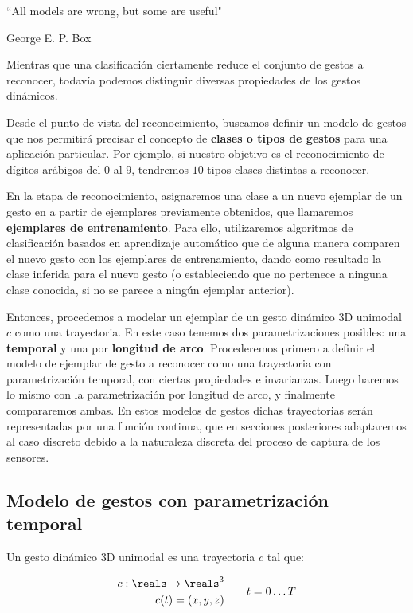 
\epigraph{``All models are wrong, but some are useful"}{George E. P. Box}


Mientras que una clasificación ciertamente reduce el conjunto de gestos a reconocer, todavía podemos distinguir diversas propiedades de los gestos dinámicos.  

Desde el punto de vista del reconocimiento, buscamos definir un modelo de gestos que nos permitirá precisar el concepto de \textbf{clases o tipos de gestos} para una aplicación particular. Por ejemplo, si nuestro objetivo es el reconocimiento de dígitos arábigos del $0$ al $9$, tendremos $10$ tipos clases distintas a reconocer. 

En la etapa de reconocimiento, asignaremos una clase a un nuevo ejemplar de un gesto en a partir de ejemplares previamente obtenidos, que llamaremos \textbf{ejemplares de entrenamiento}. Para ello, utilizaremos algoritmos de clasificación basados en aprendizaje automático que de alguna manera comparen el nuevo gesto con los ejemplares de entrenamiento, dando como resultado la clase inferida para el nuevo gesto (o estableciendo que no pertenece a ninguna clase conocida, si no se parece a ningún ejemplar anterior). 



Entonces, procedemos a modelar un ejemplar de un gesto dinámico 3D unimodal $c$ como una trayectoria. En este caso tenemos dos parametrizaciones posibles: una \textbf{temporal} y una por \textbf{longitud de arco}. Procederemos primero a definir el modelo de ejemplar de gesto a reconocer como una trayectoria con parametrización temporal, con ciertas propiedades e invarianzas. Luego haremos lo mismo con la parametrización por longitud de arco, y finalmente compararemos ambas. En estos modelos de gestos dichas trayectorias serán representadas por una función continua, que en secciones posteriores adaptaremos al caso discreto debido a la naturaleza discreta del proceso de captura de los sensores.


\subsection{Modelo de gestos con parametrización temporal}


Un gesto dinámico 3D unimodal es una trayectoria $c$ tal que: 

\begin{equation}
  \begin{split}
    c : \reals \rightarrow \reals^3 \\
    c(t)=(x,y,z)
  \end{split}
  \quad \quad
  \begin{split}
    t=0 \dots T
  \end{split}
\end{equation}  
  
